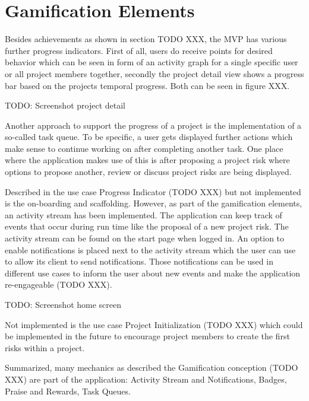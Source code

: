 
\section{Gamification Elements}
\label{sec:implementationGami}

Besides achievements as shown in section TODO XXX, the MVP has various further progress indicators. First of all, users do receive points for desired behavior which can be seen in form of an activity graph for a single specific user or all project members together, secondly the project detail view shows a progress bar based on the projects temporal progress. Both can be seen in figure XXX.

TODO: Screenshot project detail

Another approach to support the progress of a project is the implementation of a so-called task queue. To be specific, a user gets displayed further actions which make sense to continue working on after completing another task. One place where the application makes use of this is after proposing a project risk where options to propose another, review or discuss project risks are being displayed.

Described in the use case Progress Indicator (TODO XXX) but not implemented is the on-boarding and scaffolding. However, as part of the gamification elements, an activity stream has been implemented. The application can keep track of events that occur during run time like the proposal of a new project risk. The activity stream can be found on the start page when logged in. An option to enable notifications is placed next to the activity stream which the user can use to allow its client to send notifications. Those notifications can be used in different use cases to inform the user about new events and make the application re-engageable (TODO XXX).

TODO: Screenshot home screen

Not implemented is the use case Project Initialization (TODO XXX) which could be implemented in the future to encourage project members to create the first risks within a project.

Summarized, many mechanics as described the Gamification conception (TODO XXX) are part of the application: Activity Stream and Notifications, Badges, Praise and Rewards, Task Queues.